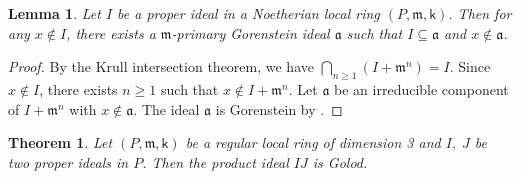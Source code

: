 \documentclass[10pt,reqno]{amsart}
\newtheorem{theorem}[subsection]{Theorem}
\newtheorem{lemma}[subsection]{Lemma}
\theoremstyle{definition}
\theoremstyle{remark}
\numberwithin{equation}{section}
\newcommand{\kk}{\mathsf k}
\newcommand{\m}{\mathfrak m}
\numberwithin{equation}{section}
\begin{document}
\begin{lemma}\label{GorensteinEmbed}
    Let $I$ be a proper ideal in a Noetherian local ring $(P,\m,\kk)$. Then for any $x\notin I$, there exists a $\m$-primary Gorenstein ideal $\mathfrak a$ such that $I\subseteq \mathfrak a$ and $x\notin \mathfrak a$. 
\end{lemma}
\begin{proof}
    By the Krull intersection theorem, we have $\bigcap_{n\geq 1} (I+\m^n)=I$. Since $x\notin I$, there exists $n\geq 1$ such that $ x\notin I+\m^n$. Let $\mathfrak a$ be an irreducible component of $I+\m^n$ with $x\notin \mathfrak a$. The ideal $\mathfrak{a}$ is Gorenstein by \cite[Theorem 3.2.10]{bruns1998cohen}.
\end{proof}

\begin{theorem}\label{maintheorem1}
    Let $(P,\m,\kk)$ be a regular local ring of dimension 3 and $I,\; J$ be two proper ideals in $P$. Then the product ideal $IJ$ is Golod.
\end{theorem}
\end{document}
